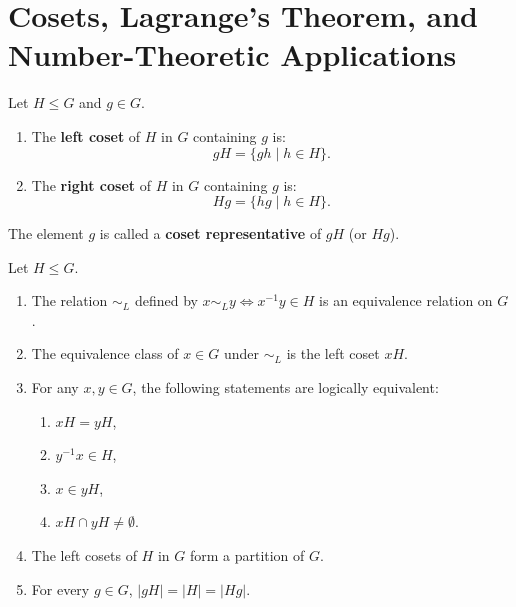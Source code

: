 \section{Cosets, Lagrange's Theorem, and Number-Theoretic Applications}
\label{sec:lagrange}

\begin{definition}
Let $H \le G$ and $g \in G$.
\begin{enumerate}[label=\textbf{(\arabic*)}, leftmargin=*, itemsep=4pt]
    \item The \textbf{left coset} of $H$ in $G$ containing $g$ is:
    \begin{equation}
    gH = \{ gh \mid h \in H \}.
    \end{equation}
    \item The \textbf{right coset} of $H$ in $G$ containing $g$ is:
    \begin{equation}
    Hg = \{ hg \mid h \in H \}.
    \end{equation}
\end{enumerate}
The element $g$ is called a \textbf{coset representative} of $gH$ (or $Hg$).
\end{definition}

\begin{lemma}
\label{lem:coset_props}
Let $H \le G$.
\begin{enumerate}[label=\textbf{(\roman*)}, leftmargin=*, itemsep=4pt]
    \item The relation $\sim_L$ defined by $x \sim_L y \iff x^{-1}y \in H$ is an equivalence relation on $G$.
    \item The equivalence class of $x \in G$ under $\sim_L$ is the left coset $xH$.
    \item For any $x, y \in G$, the following statements are logically equivalent:
    \begin{enumerate}[label=\textbf{(\alph*)}]
        \item $xH = yH$,
        \item $y^{-1}x \in H$,
        \item $x \in yH$,
        \item $xH \cap yH \ne \emptyset$.
    \end{enumerate}
    \item The left cosets of $H$ in $G$ form a partition of $G$.
    \item For every $g \in G$, $|gH| = |H| = |Hg|$.
\end{enumerate}
\end{lemma}

